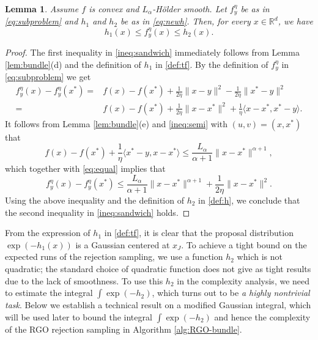 \documentclass[11pt,letterpaper]{article}
\newtheorem{lemma}[thm]{Lemma}
\newcommand{\nn}{\nonumber}
\newcommand{\R}{\mathbb{R}}
\newcommand{\inner}[2]{\langle #1,#2\rangle}
\newcommand{\tx}{\tilde x}
\begin{document}
\begin{lemma}\label{lem:h1h2delta}
Assume $f$ is convex and $L_\alpha$-Hölder smooth. Let $f_y^\eta$ be as in \eqref{eq:subproblem} and $h_1$ and $h_2$ be as in \eqref{eq:newh}.
Then, for every $x\in \R^d$, we have
\begin{equation}\label{ineq:sandwich}
    h_1(x) \le f_y^\eta(x) \le h_2(x).
\end{equation}
\end{lemma}
\begin{proof}
The first inequality in \eqref{ineq:sandwich} immediately follows from Lemma \ref{lem:bundle}(d) and the definition of $h_1$ in \eqref{def:tf}.
By the definition of $f_y^\eta$ in \eqref{eq:subproblem} we get
\begin{align}
    f_y^\eta(x) - f_y^\eta(x^*)  
    = & f(x) - f(x^*)  + \frac{1}{2\eta}\|x-y\|^2 - \frac{1}{2\eta}\|x^*-y\|^2 \nn \\
    = & f(x) - f(x^*) + \frac{1}{2\eta}\|x-x^*\|^2 + \frac{1}{\eta}\inner{x-x^*}{x^*-y}. \label{eq:equal}
\end{align}
It follows from Lemma \ref{lem:bundle}(e) and \eqref{ineq:semi} with $(u,v)=(x,x^*)$ that
\[
f(x) - f(x^*) + \frac{1}{\eta}\inner{x^*-y}{x-x^*} \le \frac{L_\alpha}{\alpha+1}\|x-x^*\|^{\alpha+1},
\]
which together with \eqref{eq:equal} implies that
\[
f_y^\eta(x) - f_y^\eta(x^*) \le \frac{L_\alpha}{\alpha+1}\|x-x^*\|^{\alpha+1} + \frac{1}{2\eta}\|x-x^*\|^2.
\]
Using the above inequality and the definition of $h_2$ in \eqref{def:h}, we conclude that the second inequality in \eqref{ineq:sandwich} holds.
\end{proof}

From the expression of $h_1$ in \eqref{def:tf}, it is clear that the proposal distribution $\exp(-h_1(x))$ is a Gaussian centered at $x_J$. To achieve a tight bound on the expected runs of the rejection sampling, we use a function $h_2$ which is not quadratic; the standard choice of quadratic function does not give as tight results due to the lack of smoothness. To use this $h_2$ in the complexity analysis, we need to estimate the integral $\int \exp(-h_2)$, which turns out to be {\em a highly nontrivial task}. Below we establish a technical result on a modified Gaussian integral, which will be used later to bound the integral $\int \exp(-h_2)$ and hence the complexity of the RGO rejection sampling in Algorithm \ref{alg:RGO-bundle}.
\end{document}
